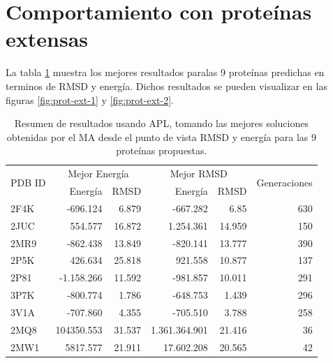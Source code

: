 \section{Comportamiento con proteínas extensas}

La tabla \ref{tab:prot-ext-summary} muestra los mejores resultados paralas 9 proteínas predichas en terminos de RMSD y energía. Dichos resultados se pueden visualizar en las figuras \ref{fig:prot-ext-1} y \ref{fig:prot-ext-2}.

\begin{table}[H]
\centering
\caption[Resumen de resultados para proteínas extensas]{Resumen de resultados usando APL, tomando las mejores soluciones obtenidas por el MA desde el punto de vista RMSD y energía para las 9 proteínas propuestas.}
\begin{tabularx}{\textwidth}{|X|r|r|r|r|r|}
\hline
 \multirow{2}{*}{PDB ID} & \multicolumn{2}{c|}{Mejor Energía} & \multicolumn{2}{c|}{Mejor RMSD} & \multirow{2}{*}{Generaciones} \\ \cline{2-5}
 & Energía & RMSD & Energía & RMSD & \\ \hline
 
 2F4K & -696.124 & 6.879 & -667.282 & 6.85 & 630\\
 2JUC & 554.577 & 16.872 & 1.254.361 & 14.959 & 150\\
 2MR9 & -862.438 & 13.849 & -820.141 & 13.777 & 390\\
 2P5K & 426.634 & 25.818 & 921.558 & 10.877 & 137\\
 2P81 & -1.158.266 & 11.592 & -981.857 & 10.011 & 291\\
 3P7K & -800.774 & 1.786 & -648.753 & 1.439 & 296\\
 3V1A & -707.860 & 4.355 & -705.510 & 3.788 & 258\\
 2MQ8 & 104350.553 & 31.537 & 1.361.364.901 & 21.416 & 36\\
 2MW1 & 5817.577 & 21.911 & 17.602.208 & 20.565 & 42\\
 
\hline 
\end{tabularx}
\label{tab:prot-ext-summary}
\end{table}



